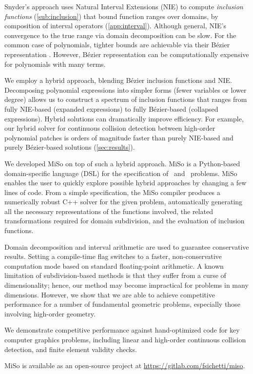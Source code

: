 Snyder's approach uses Natural Interval Extensions (NIE) to compute \emph{inclusion functions} (\cref{sub:inclusion}) that bound function ranges over domains, by composition of interval operators (\cref{app:interval}). Although general, NIE's convergence to the true range via domain decomposition can be slow. 
For the common case of polynomials, tighter bounds are achievable via their Bézier representation \cite{Lengagne:2020,stahl_interval_1995,johnen2013}. 
However, Bézier representation can be computationally expensive for polynomials with many terms. 

We employ a hybrid approach, blending Bézier inclusion functions and NIE. Decomposing polynomial expressions into simpler forms (fewer variables or lower degree) allows us to construct a spectrum of inclusion functions that ranges from fully NIE-based (expanded expressions) to fully Bézier-based (collapsed expressions).
Hybrid solutions can dramatically improve efficiency. For example, our hybrid solver for continuous collision detection between high-order polynomial patches is orders of magnitude faster than purely NIE-based and purely Bézier-based solutions (\cref{sec:results}).

We developed MiSo on top of such a hybrid approach. MiSo is a Python-based domain-specific language (DSL) for the specification of \solve\ and \minimize\ problems. MiSo enables the user to quickly explore possible hybrid approaches by changing a few lines of code.
From a simple specification, the MiSo compiler produces a numerically robust C++ solver for the given problem, automatically generating all the necessary representations of the functions involved, the related transformations required for domain subdivision, and the evaluation of inclusion functions.

Domain decomposition and interval arithmetic are used to guarantee conservative results. Setting a compile-time flag switches to a faster, non-conservative computation mode based on standard floating-point arithmetic.
A known limitation of subdivision-based methods is that they suffer from a curse of dimensionality; hence, our method may become impractical for problems in many dimensions. However, we show that we are able to achieve competitive performance for a number of fundamental geometric problems, especially those involving high-order geometry.

We demonstrate competitive performance against hand-optimized code for key computer graphics problems, including linear and high-order continuous collision detection, and finite element validity checks.

MiSo is available as an open-source project at \url{https://gitlab.com/fsichetti/miso}.

